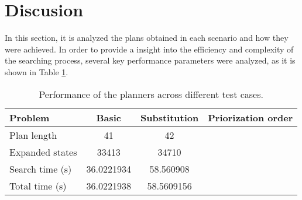 \section{Discusion}
In this section, it is analyzed the plans obtained in each scenario and how they were achieved. In order to provide a insight into the 
efficiency and complexity of the searching process, several key performance parameters were analyzed, as it is shown in Table \ref{tab:tabla}. 

\begin{table}[H]
    \begin{tabular}{|l|c|c|c|}
    \hline
    Problem         & Basic & Substitution & Priorization order \\ \hline
    Plan length     &  41     &    42          &                    \\ \hline
    Expanded states &    33413   &     34710         &                    \\ \hline
    Search time (s)    & 36.0221934      &    58.560908       &                    \\ \hline
    Total time (s)     &   36.0221938     &     58.5609156           &                    \\ \hline
    \end{tabular}\label{tab:tabla}
    \caption{Performance of the planners across different test cases.}
\end{table}